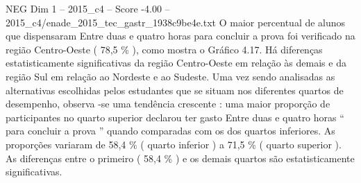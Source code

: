 \begin{textsample}{NEG Dim 1 – 2015\_c4 – Score -4.00 – 2015\_c4/enade\_2015\_tec\_gastr\_1938c9be4e.txt}
O maior percentual de alunos que dispensaram Entre duas e quatro horas para concluir a prova foi verificado na região Centro-Oeste ( 78,5 \% ), como mostra o Gráfico 4.17.
Há diferenças estatisticamente significativas da região Centro-Oeste em relação às demais e da região Sul em relação ao Nordeste e ao Sudeste.
Uma vez sendo analisadas as alternativas escolhidas pelos estudantes que se situam nos diferentes quartos de desempenho, observa -se uma tendência crescente : uma maior proporção de participantes no quarto superior declarou ter gasto Entre duas e quatro horas “ para concluir a prova ” quando comparadas com os dos quartos inferiores.
As proporções variaram de 58,4 \% ( quarto inferior ) a 71,5 \% ( quarto superior ).
As diferenças entre o primeiro ( 58,4 \% ) e os demais quartos são estatisticamente significativas.

\end{textsample}
